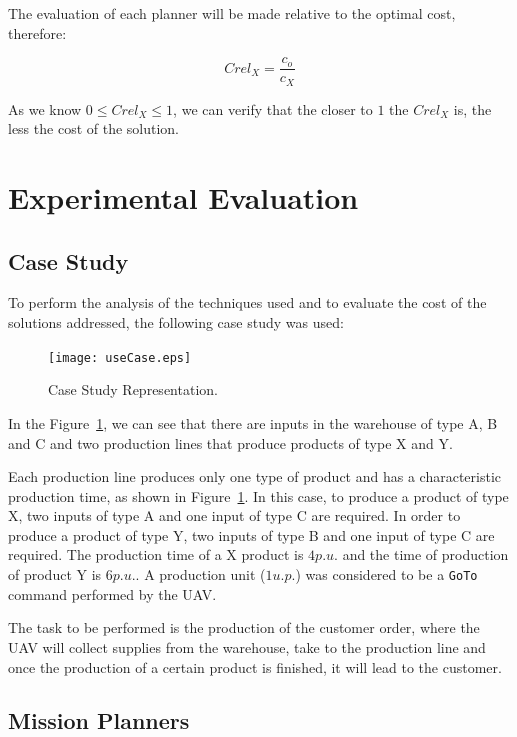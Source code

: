 \documentclass[conference,harvard,brazil,english]{sbatex}
\begin{document}
The evaluation of each planner will be made relative to the optimal cost, therefore:

\begin{equation}
Crel_X=\frac{c_o}{c_X}
\end{equation}

As we know $0 \leq Crel_X \leq 1$, we can verify that the closer to $1$ the $Crel_X$ is, the less the cost of the solution.

\section{Experimental Evaluation}
 
\subsection{Case Study}
\label{sec:ec}

To perform the analysis of the techniques used and to evaluate the cost of the solutions addressed, the following case study was used:

	\begin{figure}[H]
	\centering
	\texttt{[image: useCase.eps]}
	\caption{Case Study Representation.\label{fig:useCase}}
	\end{figure}
	
In the Figure~\ref{fig:useCase}, we can see that there are inputs in the warehouse of type A, B and C and two production lines that produce products of type X and Y.

Each production line produces only one type of product and has a characteristic production time, as shown in Figure~\ref{fig:useCase}. In this case, to produce a product of type X, two inputs of type A and one input of type C are required. In order to produce a product of type Y, two inputs of type B and one input of type C are required. The production time of a X product is $4p.u.$ and the time of production of product Y is $6p.u.$. A production unit ($1u.p.$) was considered to be a \texttt{GoTo} command performed by the UAV.

The task to be performed is the production of the customer order, where the UAV will collect supplies from the warehouse, take to the production line and once the production of a certain product is finished, it will lead to the customer.

\subsection{Mission Planners}
\end{document}
